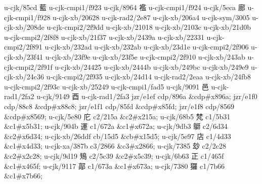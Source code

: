 \begin{multicols}{2}
u-cjk/85cd	{\cjk{}藍}	u-cjk-cmpi1/f923	{} 
u-cjk/8964	{\cjk{}襤}	u-cjk-cmpi1/f924	{} 
u-cjk/5eca	{\cjk{}廊}	u-cjk-cmpi1/f928	{} 
u-cjk-xb/20628	{	}u-cjk-rad2/2e87	{} 
u-cjk-xb/206a4	{	}u-cjk-sym/3005	{} 
u-cjk-xb/208de	{	}u-cjk-cmpi2/2f9dd	{} 
u-cjk-xb/21018	{	}u-cjk-xb/2103c	{} 
u-cjk-xb/21d0b	{	}u-cjk-cmpi2/2f8f8	{} 
u-cjk-xb/21f37	{	}u-cjk-xb/2439a	{} 
u-cjk-xb/22331	{	}u-cjk-cmpi2/2f891	{} 
u-cjk-xb/232ad	{	}u-cjk-xb/232ab	{} 
u-cjk-xb/23d1e	{	}u-cjk-cmpi2/2f906	{} 
u-cjk-xb/23f41	{	}u-cjk-xb/23f9e	{} 
u-cjk-xb/23f5e	{	}u-cjk-cmpi2/2f910	{} 
u-cjk-xb/243ab	{	}u-cjk-cmpi2/2f91f	{} 
u-cjk-xb/24425	{	}u-cjk-xb/2444b	{} 
u-cjk-xb/249bc	{	}u-cjk-xb/249e9	{} 
u-cjk-xb/24c36	{	}u-cjk-cmpi2/2f935	{} 
u-cjk-xb/24d14	{\cjk{}}	u-cjk-rad2/2eaa	{} 
u-cjk-xb/24fb8	{	}u-cjk-cmpi2/2f93c	{} 
u-cjk-xb/25249	{	}u-cjk-cmpi1/fad5	{} 
u-cjk/9091	{\cjk{}邑}	u-cjk-rad1/2fa2	{} 
u-cjk/9149	{\cjk{}酉}	u-cjk-rad1/2fa3	{} 
jzr/e1ef	{	}cdp/896a	\&cdp\#x896a; 
jzr/e1f0	{	}cdp/88c8	\&cdp\#x88c8; 
jzr/e1f1	{	}cdp/85fd	\&cdp\#x85fd; 
jzr/e1f8	{	}cdp/8569	\&cdp\#x8569; 
u-cjk/5e80	{\cjk{}庀}	c2/215a	\&c2\#x215a;
u-cjk/68b5	{\cjk{}梵}	c1/5b31	\&c1\#x5b31;
u-cjk/904b	{\cjk{}運}	c1/672a	\&c1\#x672a;
u-cjk/9db3	{\cjk{}鶳}	c2/6d34	\&c2\#x6d34;
u-cjk-xb/26ddf	{	}cb/15d5	\&cb\#x15d5;
u-cjk/5e97	{\cjk{}店}	c1/4d33	\&c1\#x4d33;
u-cjk-xa/387b	{	}c3/2866	\&c3\#x2866;
u-cjk/7385	{\cjk{}玅}	c2/2c28	\&c2\#x2c28;
u-cjk/9d19	{\cjk{}鴙}	c2/5c39	\&c2\#x5c39;
u-cjk/6b63	{\cjk{}正}	c1/465f	\&c1\#x465f;
u-cjk/9117	{\cjk{}鄗}	c1/673a	\&c1\#x673a;
u-cjk/7380	{\cjk{}玀}	c1/7b66	\&c1\#x7b66;


\end{multicols}
